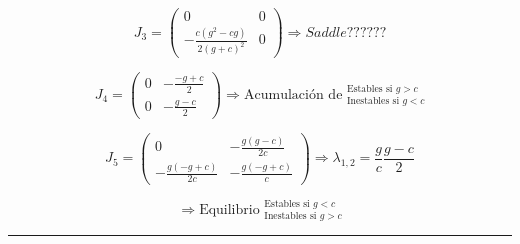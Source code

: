 \documentclass[twocolumn,aps,prl]{revtex4-1}
\newcommand*\sepline{%
  \begin{center}
    \rule[1ex]{.5\textwidth}{.5pt}
  \end{center}}
\begin{document}
$$J_3 =
\begin{pmatrix}
    0
    &
    0
    \\  
    -\frac{c\left(g^2-cg\right)}{2\left(g+c\right)^2}
    &
    0
\end{pmatrix}
\Rightarrow Saddle ??????
$$




$$J_4 =
\begin{pmatrix}
    0
    &
    -\frac{-g+c}{2}
    \\  
    0
    &
    -\frac{g-c}{2}
\end{pmatrix}
\Rightarrow \text{Acumulación de } ^{\text{Estables si } g>c}_{\text{Inestables si } g<c}
$$


$$J_5 =
\begin{pmatrix}
    0
    &
    -\frac{g\left(g-c\right)}{2c}
    \\  
    -\frac{g\left(-g+c\right)}{2c}
    &
    -\frac{g\left(-g+c\right)}{c}
\end{pmatrix}
\Rightarrow  \lambda_{1,2} = \frac{g}{c} \frac{g-c}{2}
$$

$$
\Rightarrow \text{Equilibrio }  ^{\text{Estables si } g<c}_{\text{Inestables si } g>c}
$$



\sepline
\end{document}
